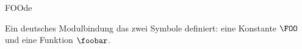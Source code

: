 \begin{mhmodnl}{FOO}{de}
  \begin{definition}
    Ein deutsches Modulbindung das zwei Symbole definiert: eine Konstante $\FOO$ und eine
    Funktion $\foobar$.
  \end{definition}
\end{mhmodnl}

